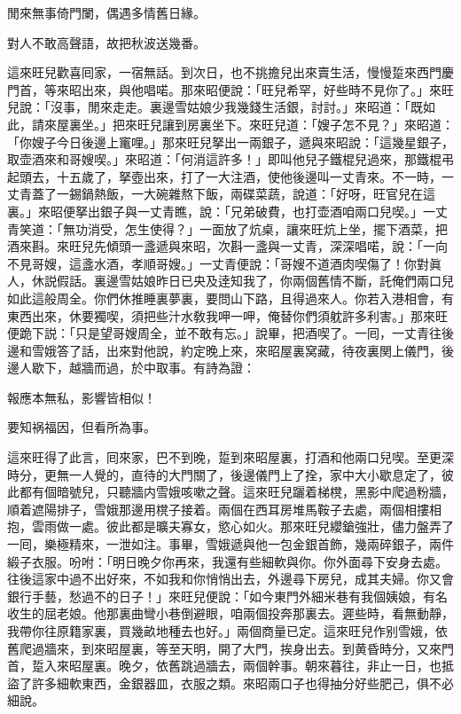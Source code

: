 \begin{myquote}
閒來無事倚門闌，偶遇多情舊日緣。

對人不敢高聲語，故把秋波送幾番。
\end{myquote}

這來旺兒歡喜囘家，一宿無話。到次日，也不挑擔兒出來賣生活，慢慢踅來西門慶門首，等來昭出來，與他唱喏。那來昭便說：「旺兒希罕，好些時不見你了。」來旺兒說：「沒事，閒來走走。裏邊雪姑娘少我幾錢生活銀，討討。」來昭道：「既如此，請來屋裏坐。」把來旺兒讓到房裏坐下。來旺兒道：「嫂子怎不見？」來昭道：「你嫂子今日後邊上竃哩。」那來旺兒拏出一兩銀子，遞與來昭說：「這幾星銀子，取壶酒來和哥嫂喫。」來昭道：「何消這許多！」即叫他兒子鐵棍兒過來，那鐵棍弔起頭去，十五歲了，拏壺出來，打了一大注酒，使他後邊叫一丈青來。不一時，一丈青蓋了一錫鍋熱飯，一大碗雜熬下飯，兩碟菜蔬，說道：「好呀，旺官兒在這裏。」來昭便拏出銀子與一丈青瞧，說：「兄弟破費，也打壶酒咱兩口兒喫。」一丈青笑道：「無功消受，怎生使得？」一面放了炕桌，讓來旺炕上坐，擺下酒菜，把酒來斟。來旺兒先傾頭一盞遞與來昭，次斟一盞與一丈青，深深唱喏，說：「一向不見哥嫂，這盞水酒，孝順哥嫂。」一丈青便說：「哥嫂不道酒肉喫傷了！你對眞人，休説假話。裏邊雪姑娘昨日已央及逹知我了，你兩個舊情不斷，託俺們兩口兒如此這般周全。你們休推睡裏夢裏，要問山下路，且得過來人。你若入港相會，有東西出來，休要獨喫，須把些汁水敎我呷一呷，俺替你們須躭許多利害。」那來旺便跪下説：「只是望哥嫂周全，並不敢有忘。」說畢，把酒喫了。一囘，一丈青往後邊和雪娥答了話，出來對他說，約定晚上來，來昭屋裏窝藏，待夜裏関上儀門，後邊人歇下，越牆而過，於中取事。有詩為證：

\begin{myquote}
報應本無私，影響皆相似！

要知祸福因，但看所為事。
\end{myquote}

這來旺得了此言，囘來家，巴不到晚，踅到來昭屋裏，打酒和他兩口兒喫。至更深時分，更無一人覺的，直待的大門關了，後邊儀門上了拴，家中大小歇息定了，彼此都有個暗號兒，只聽牆内雪娥咳嗽之聲。這來旺兒躧着梯櫈，黑影中爬過粉牆，順着遮陽排子，雪娥那邊用櫈子接着。兩個在西耳房堆馬鞍子去處，兩個相摟相抱，雲雨做一處。彼此都是曠夫寡女，慾心如火。那來旺兒纓鎗強壯，儘力盤弄了一囘，樂極精來，一泄如注。事畢，雪娥遞與他一包金銀首飾，幾兩碎銀子，兩件緞子衣服。吩咐：「明日晚夕你再來，我還有些細軟與你。你外面尋下安身去處。往後這家中過不出好來，不如我和你悄悄出去，外邊尋下房兒，成其夫婦。你又會銀行手藝，愁過不的日子！」來旺兒便說：「如今東門外細米巷有我個姨娘，有名收生的屈老娘。他那裏曲彎小巷倒避眼，咱兩個投奔那裏去。遲些時，看無動靜，我帶你往原籍家裏，買幾畝地種去也好。」兩個商量已定。這來旺兒作别雪娥，依舊爬過牆來，到來昭屋裏，等至天明，開了大門，挨身出去。到黄昏時分，又來門首，踅入來昭屋裏。晚夕，依舊跳過牆去，兩個幹事。朝來暮往，非止一日，也抵盜了許多細軟東西，金銀器皿，衣服之類。來昭兩口子也得抽分好些肥己，俱不必細說。

